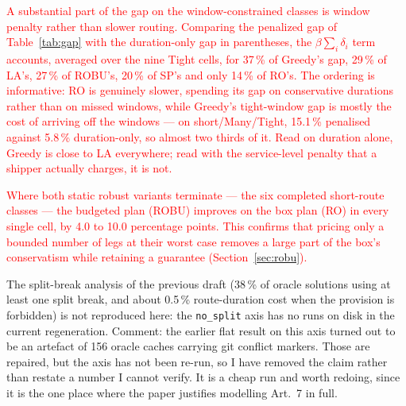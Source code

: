 \documentclass[preprint,12pt,3p]{elsarticle}
\newcommand{\red}[1]{\textcolor{red}{#1}}
\newcommand{\green}[1]{{\color{darkgreen}#1}}
\newcommand{\blue}[1]{{\color{darkblue}#1}}
\begin{document}
\red{A substantial part of the gap on the window-constrained classes is window
penalty rather than slower routing. Comparing the penalized gap of
Table~\ref{tab:gap} with the duration-only gap in parentheses, the
$\beta\sum_i\delta_i$ term accounts, averaged over the nine Tight cells, for
37\,\% of Greedy's gap, 29\,\% of LA's, 27\,\% of ROBU's, 20\,\% of SP's and
only 14\,\% of RO's. The ordering is informative: RO is genuinely slower,
spending its gap on conservative durations rather than on missed windows, while
Greedy's tight-window gap is mostly the cost of arriving off the windows --- on
short/Many/Tight, 15.1\,\% penalised against 5.8\,\% duration-only, so
almost two thirds of it. Read on duration alone, Greedy is close to LA
everywhere; read with the service-level penalty that a shipper actually
charges, it is not.}

\red{Where both static robust variants terminate --- the six completed
short-route classes --- the budgeted plan (ROBU) improves on the box plan (RO)
in every single cell, by 4.0 to 10.0 percentage points. This confirms that
pricing only a bounded number of legs at their worst case removes a large part
of the box's conservatism while retaining a guarantee (Section~\ref{sec:robu}).}

\blue{The split-break analysis of the previous draft (38\,\% of oracle solutions
using at least one split break, and about 0.5\,\% route-duration cost when the
provision is forbidden) is not reproduced here: the \texttt{no\_split} axis has
no runs on disk in the current regeneration.}
\green{Comment: the earlier flat result on this axis turned out to be an
artefact of 156 oracle caches carrying git conflict markers. Those are repaired,
but the axis has not been re-run, so I have removed the claim rather than
restate a number I cannot verify. It is a cheap run and worth redoing, since it
is the one place where the paper justifies modelling Art.~7 in full.}
\end{document}
